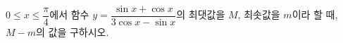 $0\le x\le\dfrac{\pi}{4}$에서 함수 $y=\dfrac{\sin x+\cos x}{3\cos x-\sin x}$의 최댓값을 $M$, 최솟값을 $m$이라 할 때, $M-m$의 값을 구하시오.

